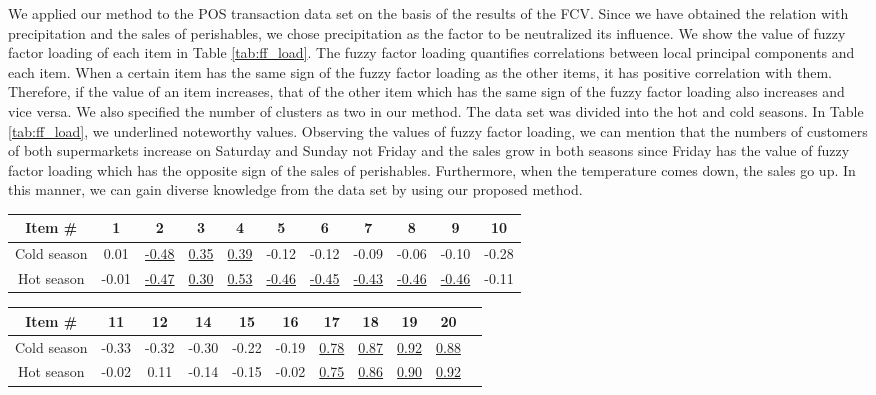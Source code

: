 \documentclass{article}
\begin{document}
We applied our method to the POS transaction data set on the basis of the results of the FCV. Since we have obtained the relation with precipitation and the sales of perishables, we chose precipitation as the factor to be neutralized its influence. We show the value of fuzzy factor loading \cite{Yabuuchi} of each item in Table \ref{tab:ff_load}. The fuzzy factor loading quantifies correlations between local principal components and each item. When a certain item has the same sign of the fuzzy factor loading as the other items, it has positive correlation with them. Therefore, if the value of an item increases, that of the other item which has the same sign of the fuzzy factor loading also increases and vice versa. We also specified the number of clusters as two in our method. The data set was divided into the hot and cold seasons. In Table \ref{tab:ff_load}, we underlined noteworthy values. Observing the values of fuzzy factor loading, we can mention that the numbers of customers of both supermarkets increase on Saturday and Sunday not Friday and the sales grow in both seasons since Friday has the value of fuzzy factor loading which has the opposite sign of the sales of perishables. Furthermore, when the temperature comes down, the sales go up. In this manner, we can gain diverse knowledge from the data set by using our proposed method.

\begin{table*}[bt]
\caption{Fuzzy Factor Loading.}
%
\begin{center}
\begin{tabular}{|c||c|c|c|c|c|c|c|c|c|c|} \hline
Item \#& 1 & 2 & 3 & 4 & 5 & 6 & 7 & 8 & 9 & 10 \\\hline\hline
Cold season & 0.01 & \underline{-0.48} & \underline{0.35} & \underline{0.39} & -0.12 & -0.12 & -0.09 & -0.06 & -0.10 & -0.28 \\\hline
Hot season & -0.01 & \underline{-0.47} & \underline{0.30} & \underline{0.53} & \underline{-0.46} & \underline{-0.45} & \underline{-0.43} & \underline{-0.46} & \underline{-0.46} & -0.11 \\\hline
\end{tabular}
%
\end{center}
\begin{center}
\begin{tabular}{|c||c|c|c|c|c|c|c|c|c|c|} \hline
Item \# & 11 & 12 & 14 & 15 & 16 & 17 & 18 & 19 & 20 \\\hline\hline
Cold season & -0.33 & -0.32 & -0.30 & -0.22 & -0.19 & \underline{0.78} & \underline{0.87} & \underline{0.92} & \underline{0.88} \\\hline
Hot season & -0.02 & 0.11 & -0.14 & -0.15 & -0.02 & \underline{0.75} & \underline{0.86} & \underline{0.90} & \underline{0.92} \\\hline
\end{tabular}
\end{center}
%
\label{tab:ff_load}
\end{table*}
\end{document}
